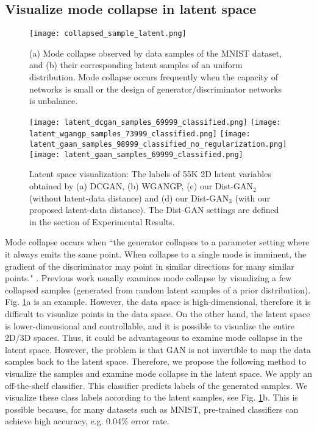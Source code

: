 \documentclass[runningheads]{llncs}
\newcommand*{\eg}{e.g. }
\begin{document}
\subsection{Visualize mode collapse in latent space}
\begin{figure}[t]
\centering
\texttt{[image: collapsed\_sample\_latent.png]}
\caption{(a) Mode collapse observed by data samples of the MNIST dataset, and (b) their corresponding latent samples of an uniform distribution. Mode collapse occurs frequently when the capacity of networks is small or the design of generator/discriminator networks is unbalance.}
\label{collapsed_mnist_dcgan}
\end{figure}
\begin{figure*}[t]
\centering
\texttt{[image: latent\_dcgan\_samples\_69999\_classified.png]}
\texttt{[image: latent\_wgangp\_samples\_73999\_classified.png]}
\texttt{[image: latent\_gaan\_samples\_98999\_classified\_no\_regularization.png]}
\texttt{[image: latent\_gaan\_samples\_69999\_classified.png]}
\caption{Latent space visualization: The labels of 55K 2D latent variables obtained by (a) DCGAN, (b) WGANGP, (c) our Dist-GAN$_2$ (without latent-data distance) and (d) our Dist-GAN$_3$ (with our proposed latent-data distance). The Dist-GAN settings are defined in the section of Experimental Results.}
\label{classified_mnist_dcgan}
\end{figure*}
Mode collapse occurs when ``the generator collapses to a parameter setting where it always emits the same point. When collapse to a single mode is imminent, the gradient of the discriminator may point in similar directions for many similar points." \cite{salimans-nisp-2016}. 
Previous work usually examines mode collapse by visualizing a few collapsed samples (generated from random latent samples of a prior distribution). Fig. \ref{collapsed_mnist_dcgan}a is an example. However, the data space is high-dimensional, therefore it is difficult to visualize points in the data space. On the other hand, the latent space is lower-dimensional and controllable, and it is possible to visualize the entire 2D/3D spaces. 
Thus, it could be advantageous to examine mode collapse in the latent space.
However, the problem is that GAN is not invertible to map the data samples back to the latent space.
Therefore, we propose the following method to visualize the samples and examine mode collapse in the latent space.
We apply an off-the-shelf classifier. This classifier predicts labels of the generated samples. We visualize these class labels according to the latent samples, see
Fig. \ref{collapsed_mnist_dcgan}b.
This is possible because, for many datasets such as MNIST, pre-trained classifiers  can achieve high accuracy, \eg 0.04\% error rate. 
\end{document}
